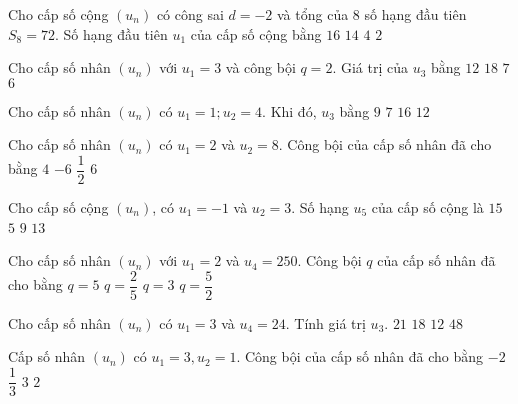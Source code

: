 \begin{ex}
Cho cấp số cộng $(u_n)$ có công sai $d=-2$ và tổng của $8$ số hạng đầu tiên $S_8=72$. Số hạng đầu tiên $u_1$ của cấp số cộng bằng
\choice
{\True $16$}
{$14$}
{$4$}
{$2$}
\end{ex}
\begin{ex}
Cho cấp số nhân $(u_n)$ với $u_1=3$ và công bội $q=2$. Giá trị của $u_3$ bằng 
\choice
{\True $12$}
{$18$}
{$7$}
{$6$}
\end{ex}
\begin{ex}
Cho cấp số nhân $(u_n)$ có $u_1=1;u_2=4$. Khi đó, $u_3$ bằng
\choice
{$9$}
{$7$}
{\True $16$}
{$12$}
\end{ex}
\begin{ex}
Cho cấp số nhân $(u_n)$ có $u_1=2$ và $u_2=8$. Công bội của cấp số nhân đã cho bằng
\choice
{\True $4$}
{$-6$}
{$\dfrac{1}{2}$}
{$6$}
\end{ex}
\begin{ex}
Cho cấp số cộng $(u_n)$, có $u_1=-1$ và $u_2=3$. Số hạng $u_5$ của cấp số cộng là
\choice
{\True $15$}
{$5$}
{$9$}
{$13$}
\end{ex}
\begin{ex}
Cho cấp số nhân $(u_n)$ với $u_1=2$ và $u_4=250$. Công bội $q$ của cấp số nhân đã cho bằng
\choice
{\True $q=5$}
{$q=\dfrac{2}{5}$}
{$q=3$}
{$q=\dfrac{5}{2}$ }
\end{ex}
\begin{ex}
Cho cấp số nhân $(u_n)$ có $u_1=3$ và $u_4=24$. Tính giá trị $u_3$.
\choice
{$21$}
{$18$}
{\True $12$}
{$48$}
\end{ex}
\begin{ex}
Cấp số nhân $(u_n)$ có $u_1=3,u_2=1$. Công bội của cấp số nhân đã cho bằng
\choice
{$-2$}
{\True $\dfrac{1}{3}$}
{$3$}
{$2$ }
\end{ex}
